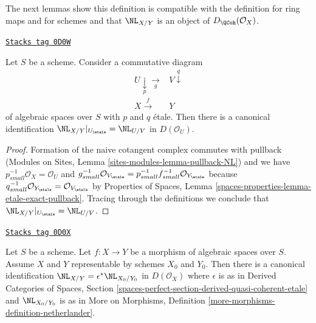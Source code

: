 The next lemmas show this definition is compatible with the definition
for ring maps and for schemes and that $\NL_{X/Y}$ is an
object of $D_\QCoh(\mathcal{O}_X)$.

\begin{lemma}
\label{spaces-more-morphisms-lemma-NL-etale-localization}
\href{https://stacks.math.columbia.edu/tag/0D0W}{\texttt{Stacks tag 0D0W}}

Let $S$ be a scheme. Consider a commutative diagram
$$
\begin{array}{cc}U \underset{p}{\downarrow}\underset{g}{\longrightarrow} & V \overset{q}{\downarrow} \\ X \overset{f}{\longrightarrow} & Y\end{array}
$$
of algebraic spaces over $S$ with $p$ and $q$ \'etale.
Then there is a canonical identification
$\NL_{X/Y}|_{U_\etale} = \NL_{U/V}$ in $D(\mathcal{O}_U)$.
\end{lemma}

\begin{proof}
Formation of the naive cotangent complex commutes with pullback
(Modules on Sites, Lemma \ref{sites-modules-lemma-pullback-NL})
and we have $p_{small}^{-1}\mathcal{O}_X = \mathcal{O}_U$ and
$g_{small}^{-1}\mathcal{O}_{V_\etale} =
p_{small}^{-1}f_{small}^{-1}\mathcal{O}_{Y_\etale}$
because $q_{small}^{-1}\mathcal{O}_{Y_\etale} =
\mathcal{O}_{V_\etale}$ by Properties of Spaces, Lemma
\ref{spaces-properties-lemma-etale-exact-pullback}.
Tracing through the definitions we conclude that
$\NL_{X/Y}|_{U_\etale} = \NL_{U/V}$.
\end{proof}

\begin{lemma}
\label{spaces-more-morphisms-lemma-NL-compare-spaces-schemes}
\href{https://stacks.math.columbia.edu/tag/0D0X}{\texttt{Stacks tag 0D0X}}

Let $S$ be a scheme. Let $f : X \to Y$ be a morphism of algebraic spaces
over $S$. Assume $X$ and $Y$ representable by schemes $X_0$ and $Y_0$.
Then there is a canonical identification
$\NL_{X/Y} = \epsilon^*\NL_{X_0/Y_0}$ in $D(\mathcal{O}_X)$
where $\epsilon$ is as in Derived Categories of Spaces, Section
\ref{spaces-perfect-section-derived-quasi-coherent-etale}
and $\NL_{X_0/Y_0}$ is as in
More on Morphisms, Definition
\ref{more-morphisms-definition-netherlander}.
\end{lemma}

